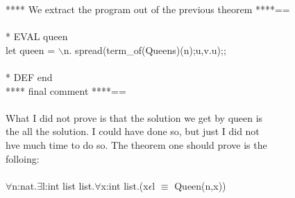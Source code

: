 \N{}      **** We extract the program out of the previous theorem ****== \\{}
\N{} \\{}
\N{}* EVAL queen \\{}
\N{}      let queen = \(\backslash{}\)n. spread(term\_of(Queens)(n);u,v.u);; \\{}
\N{} \\{}
\N{}* DEF end \\{}
\N{}      **** final comment ****== \\{}
\N{}       \\{}
\N{}      What I did not prove is that the solution we get by queen is \\{}
\N{}      the all the solution.  I could have done so, but just I did not \\{}
\N{}      hve much time to do so.  The theorem one should prove is the \\{}
\N{}      folloing: \\{}
\N{}       \\{}
\N{}          \(\forall{}\)n:nat.\(\exists{}\)l:int list list.\(\forall{}\)x:int list.(x\(\epsilon{}\)l \(\equiv{}\) Queen(n,x)) \\{}
\N{} \\{}
\N{}
